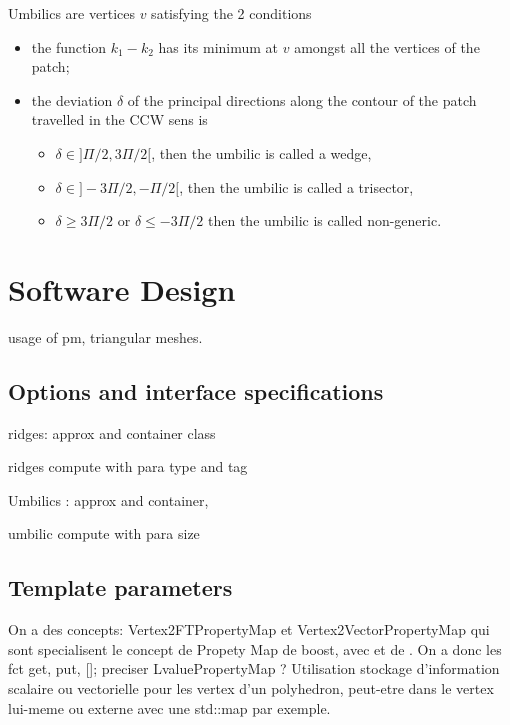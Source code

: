 Umbilics are vertices $v$ satisfying the 2 conditions
\begin{itemize}
\item
the function $k_1-k_2$ has its minimum at $v$ amongst all the
vertices of the patch;
\item
the deviation $\delta$ of the principal directions along the contour
of the patch travelled in the CCW sens is
\begin{itemize}
\item
$\delta \in ]\Pi/2,3\Pi/2[$, then the umbilic is called a wedge,
\item
$\delta \in ]-3\Pi/2,-\Pi/2[$, then the umbilic is called a trisector,
\item
$\delta \geq 3\Pi/2$ or $\delta \leq -3\Pi/2$ then the umbilic is called non-generic.
\end{itemize}
\end{itemize}

\section{Software Design}

usage of pm, triangular meshes.

\subsection{Options and interface specifications}
ridges: approx and container class

ridges compute with para type and tag

Umbilics : approx and container, 

umbilic compute with para 
size

\subsection{Template parameters}

On a des concepts: Vertex2FTPropertyMap et Vertex2VectorPropertyMap
qui sont specialisent le concept de Propety Map de boost, avec
 et de . On a donc les fct get,
put, []; preciser LvaluePropertyMap ? Utilisation stockage
d'information scalaire ou vectorielle pour les vertex d'un polyhedron,
peut-etre dans le vertex lui-meme ou externe avec une std::map par
exemple. 

